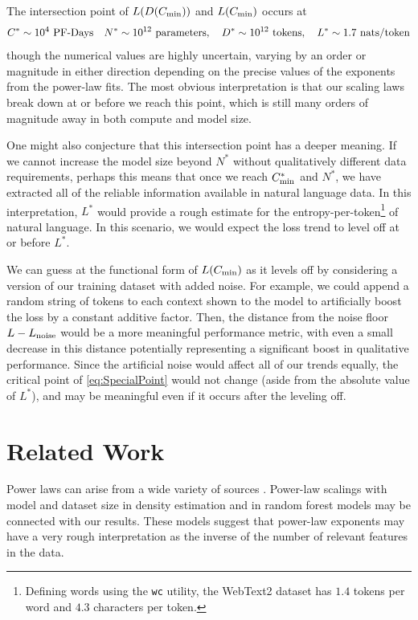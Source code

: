 \documentclass[english]{article}
\newcommand{\be}{\begin{equation}}
\newcommand{\ee}{\end{equation}}
\begin{document}
The intersection point of $L(D(C_{\rm min}))$ and $L(C_{\rm min})$ occurs at
\be
C^* \sim 10^4~\mathrm{PF}{\text -}\mathrm{Days}
\quad
N^* \sim 10^{12}~\text{parameters},
\quad
D^* \sim 10^{12}~\text{tokens},
\quad
L^* \sim 1.7~\text{nats/token}
\label{eq:SpecialPoint}
\ee
though the numerical values are highly uncertain, varying by an order or magnitude in either direction depending on the precise values of the exponents from the power-law fits.  The most obvious interpretation is that our scaling laws break down at or before we reach this point, which is still many orders of magnitude away in both compute and model size.  

One might also conjecture that this intersection point has a deeper meaning.  If we cannot increase the model size beyond $N^*$ without qualitatively different data requirements, perhaps this means that once we reach $C_{\rm min}^*$ and $N^*$, we have extracted all of the reliable information available in natural language data.  In this interpretation, $L^*$ would provide a rough estimate for the entropy-per-token\footnote{Defining words using the \texttt{wc} utility, the WebText2 dataset has $1.4$ tokens per word and $4.3$ characters per token. } of natural language.  In this scenario, we would expect the loss trend to level off at or before $L^*$.

We can guess at the functional form of $L(C_{\rm min})$ as it levels off by considering a version of our training dataset with added noise.  For example, we could append a random string of tokens to each context shown to the model to artificially boost the loss by a constant additive factor. Then, the distance from the noise floor $L-L_{\rm noise}$ would be a more meaningful performance metric, with even a small decrease in this distance potentially representing a significant boost in qualitative performance. Since the artificial noise would affect all of our trends equally, the critical point of \ref{eq:SpecialPoint} would not change (aside from the absolute value of $L^*$), and may be meaningful even if it occurs after the leveling off.

\section{Related Work}

Power laws can arise from a wide variety of sources \cite{thurner2018introduction}.  Power-law scalings with model and dataset size in density estimation \cite{wasserman2006all} and  in random forest models \cite{biau2012analysis} may be connected with our results. These models suggest that power-law exponents may have a very rough interpretation as the inverse of the number of relevant features in the data.
\end{document}
